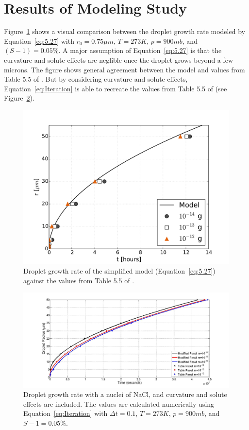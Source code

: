 \documentclass[titlepage]{article}
\begin{document}
\section{Results of Modeling Study}
Figure~\ref{fig:r_t} shows a visual comparison between the droplet growth rate
modeled by Equation~\eqref{eq:5.27} with $r_0 = 0.75 \mu m$, $T=273 K$, $p=900
mb$, and $(S - 1) = 0.05\%$. A major assumption of Equation~\eqref{eq:5.27} is
that the curvature and solute effects are neglible once the droplet grows
beyond a few microns. The figure shows general agreement between the model and
values from Table 5.5 of \cite{Curry}. But by considering curvature and solute
effects, Equation~\eqref{eq:Iteration} is able to recreate the values from
Table 5.5 of \cite{Curry} (see Figure~\ref{fig:r_t_modified}).

\begin{figure}[h]
    \centering
    \includegraphics[width=\textwidth]{r_t.pdf}
    \caption{Droplet growth rate of the simplified model (Equation~\eqref{eq:5.27}) against the values from Table 5.5 of \cite{Curry}.}
    \label{fig:r_t}
\end{figure}

\begin{figure}[h]
    \centering
    \includegraphics[width=\textwidth]{r_t_modified.jpg}
    \caption{Droplet growth rate with a nuclei of NaCl, and curvature and solute effects are included. The values are calculated numerically using Equation~\eqref{eq:Iteration} with $\Delta t = 0.1$, $T = 273 K$, $p = 900 mb$, and $S - 1 = 0.05 \%$.}
    \label{fig:r_t_modified}
\end{figure}
\end{document}
